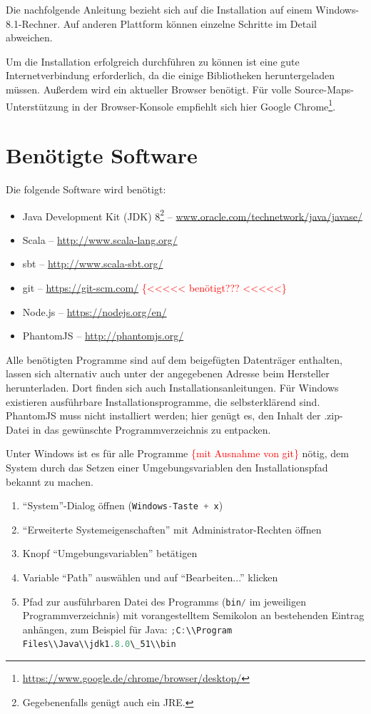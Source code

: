 \documentclass[a4paper, 12pt, hidelinks, listof=totoc, listoftables=totoc, bibliography=totoc]{scrreprt}
\newcommand{\code}[1]{\lstinline[language=Scala, style=inline]|#1|}
\newcommand{\TODOi}[1]{\textcolor{red}{\{#1\}}}
\begin{document}
Die nachfolgende Anleitung bezieht sich auf die Installation auf einem Windows-8.1-Rechner. Auf anderen Plattform können einzelne Schritte im Detail abweichen.

Um die Installation erfolgreich durchführen zu können ist eine gute Internetverbindung erforderlich, da die einige Bibliotheken heruntergeladen müssen. Außerdem wird ein aktueller Browser benötigt. Für volle Source-Maps-Unterstützung in der Browser-Konsole empfiehlt sich hier Google Chrome\footnote{\url{https://www.google.de/chrome/browser/desktop/}}.

\section{Benötigte Software}

Die folgende Software wird benötigt:

\begin{itemize}
	\item Java Development Kit (JDK) 8\footnote{Gegebenenfalls genügt auch ein JRE.}  --  \url{www.oracle.com/technetwork/java/javase/}
	\item Scala  --  \url{http://www.scala-lang.org/}
	\item sbt  --  \url{http://www.scala-sbt.org/}
	\item git  --  \url{https://git-scm.com/} \TODOi{<<<<< benötigt??? <<<<<}
	\item Node.js  --  \url{https://nodejs.org/en/}
	\item PhantomJS  --  \url{http://phantomjs.org/}
\end{itemize}

Alle benötigten Programme sind auf dem beigefügten Datenträger enthalten, lassen sich alternativ auch unter der angegebenen Adresse beim Hersteller herunterladen. Dort finden sich auch Installationsanleitungen. Für Windows existieren ausführbare Installationsprogramme, die selbsterklärend sind. PhantomJS muss nicht installiert werden; hier genügt es, den Inhalt der .zip-Datei in das gewünschte Programmverzeichnis zu entpacken.

Unter Windows ist es für alle Programme \TODOi{mit Ausnahme von git} nötig, dem System durch das Setzen einer Umgebungsvariablen den Installationspfad bekannt zu machen.


\begin{enumerate}
\item "`System"'-Dialog öffnen (\code{Windows-Taste + x})
\item "`Erweiterte Systemeigenschaften"' mit Administrator-Rechten öffnen
\item Knopf "`Umgebungsvariablen"' betätigen
\item Variable "`Path"' auswählen und auf "`Bearbeiten..."' klicken
\item Pfad zur ausführbaren Datei des Programms (\code{bin/} im jeweiligen Programmverzeichnis) mit vorangestelltem Semikolon an bestehenden Eintrag anhängen, zum Beispiel für Java: \code{;C:\\Program Files\\Java\\jdk1.8.0\_51\\bin}
\end{enumerate}
\end{document}
